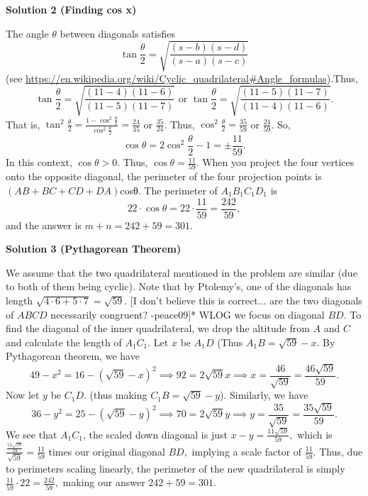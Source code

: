 \begin{enumerate}
 



\textbf{Solution 2 (Finding cos x)}

The angle $\theta$ between diagonals satisfies 
 \[\tan{\frac{\theta}{2}}=\sqrt{\frac{(s-b)(s-d)}{(s-a)(s-c)}}\] (see \href{https://en.wikipedia.org/wiki/Cyclic\_quadrilateral\#Angle\_formulas}{https://en.wikipedia.org/wiki/Cyclic\_quadrilateral\#Angle\_formulas}).Thus, 
 \[\tan{\frac{\theta}{2}}=\sqrt{\frac{(11-4)(11-6)}{(11-5)(11-7)}}\text{ or }\tan{\frac{\theta}{2}}=\sqrt{\frac{(11-5)(11-7)}{(11-4)(11-6)}}.\]That is, $\tan^2{\frac{\theta}{2}}=\frac{1-\cos^2{\frac{\theta}{2}}}{\cos^2{\frac{\theta}{2}}}=\frac{24}{35}$ or $\frac{35}{24}$. Thus, $\cos^2{\frac{\theta}{2}}=\frac{35}{59}$ or $\frac{24}{59}$. So,
 \[\cos{\theta}=2\cos^2{\frac{\theta}{2}}-1=\pm\frac{11}{59}.\]In this context, $\cos{\theta}>0$. Thus, $\cos{\theta}=\frac{11}{59}$. When you project the four vertices onto the opposite diagonal, the perimeter of the four projection points is  $({AB+BC+CD+DA})$cosθ. The perimeter of $A_1B_1C_1D_1$ is 
 \[22\cdot\cos{\theta}=22\cdot\frac{11}{59}=\frac{242}{59},\] and the answer is $m+n=242+59=\boxed{301}$.

 



\textbf{Solution 3 (Pythagorean Theorem)}

We assume that the two quadrilateral mentioned in the problem are similar (due to both of them being cyclic). Note that by Ptolemy’s, one of the diagonals has length $\sqrt{4 \cdot 6 + 5 \cdot 7} = \sqrt{59}.$ [I don't believe this is correct... are the two diagonals of $ABCD$ necessarily congruent? -peace09]* WLOG we focus on diagonal $BD.$ To find the diagonal of the inner quadrilateral, we drop the altitude from $A$ and $C$ and calculate the length of $A_1C_1.$ Let $x$ be $A_1D$ (Thus $A_1B = \sqrt{59} - x.$ By Pythagorean theorem, we have 
 \[49 - x^2 = 16 - \left(\sqrt{59} - x\right)^2 \implies 92 = 2\sqrt{59}x \implies x = \frac{46}{\sqrt{59}} = \frac{46\sqrt{59}}{59}.\] Now let $y$ be $C_1D.$ (thus making $C_1B = \sqrt{59} - y$). Similarly, we have 
 \[36 - y^2 = 25 - \left(\sqrt{59} - y\right)^2 \implies 70 = 2\sqrt{59}y \implies y = \frac{35}{\sqrt{59}} = \frac{35\sqrt{59}}{59}.\] We see that $A_1C_1$, the scaled down diagonal is just $x - y = \frac{11\sqrt{59}}{59},$ which is $\frac{\frac{11\sqrt{59}}{59}}{\sqrt{59}} = \frac{11}{59}$ times our original diagonal $BD,$ implying a scale factor of $\frac{11}{59}.$ Thus, due to perimeters scaling linearly, the perimeter of the new quadrilateral is simply $\frac{11}{59} \cdot 22 = \frac{242}{59},$ making our answer $242+59 = \boxed{301}.$


\end{enumerate}
